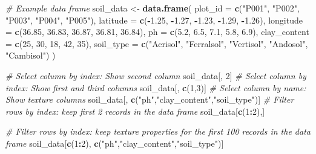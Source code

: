 \documentclass[
  10pt,
  b5paper,
  oneside]{book}
\newenvironment{Shaded}{\begin{snugshade}}{\end{snugshade}}
\newcommand{\AttributeTok}[1]{\textcolor[rgb]{0.13,0.29,0.53}{#1}}
\newcommand{\CommentTok}[1]{\textcolor[rgb]{0.56,0.35,0.01}{\textit{#1}}}
\newcommand{\DecValTok}[1]{\textcolor[rgb]{0.00,0.00,0.81}{#1}}
\newcommand{\FloatTok}[1]{\textcolor[rgb]{0.00,0.00,0.81}{#1}}
\newcommand{\FunctionTok}[1]{\textcolor[rgb]{0.13,0.29,0.53}{\textbf{#1}}}
\newcommand{\NormalTok}[1]{#1}
\newcommand{\OtherTok}[1]{\textcolor[rgb]{0.56,0.35,0.01}{#1}}
\newcommand{\SpecialCharTok}[1]{\textcolor[rgb]{0.81,0.36,0.00}{\textbf{#1}}}
\newcommand{\StringTok}[1]{\textcolor[rgb]{0.31,0.60,0.02}{#1}}
\begin{document}
\begin{Shaded}
\begin{Highlighting}[]
\CommentTok{\# Example data frame}
\NormalTok{soil\_data }\OtherTok{\textless{}{-}} \FunctionTok{data.frame}\NormalTok{(}
  \AttributeTok{plot\_id =} \FunctionTok{c}\NormalTok{(}\StringTok{"P001"}\NormalTok{, }\StringTok{"P002"}\NormalTok{, }\StringTok{"P003"}\NormalTok{, }\StringTok{"P004"}\NormalTok{, }\StringTok{"P005"}\NormalTok{),}
  \AttributeTok{latitude =} \FunctionTok{c}\NormalTok{(}\SpecialCharTok{{-}}\FloatTok{1.25}\NormalTok{, }\SpecialCharTok{{-}}\FloatTok{1.27}\NormalTok{, }\SpecialCharTok{{-}}\FloatTok{1.23}\NormalTok{, }\SpecialCharTok{{-}}\FloatTok{1.29}\NormalTok{, }\SpecialCharTok{{-}}\FloatTok{1.26}\NormalTok{),}
  \AttributeTok{longitude =} \FunctionTok{c}\NormalTok{(}\FloatTok{36.85}\NormalTok{, }\FloatTok{36.83}\NormalTok{, }\FloatTok{36.87}\NormalTok{, }\FloatTok{36.81}\NormalTok{, }\FloatTok{36.84}\NormalTok{),}
  \AttributeTok{ph =} \FunctionTok{c}\NormalTok{(}\FloatTok{5.2}\NormalTok{, }\FloatTok{6.5}\NormalTok{, }\FloatTok{7.1}\NormalTok{, }\FloatTok{5.8}\NormalTok{, }\FloatTok{6.9}\NormalTok{),}
  \AttributeTok{clay\_content =} \FunctionTok{c}\NormalTok{(}\DecValTok{25}\NormalTok{, }\DecValTok{30}\NormalTok{, }\DecValTok{18}\NormalTok{, }\DecValTok{42}\NormalTok{, }\DecValTok{35}\NormalTok{),}
  \AttributeTok{soil\_type =} \FunctionTok{c}\NormalTok{(}\StringTok{"Acrisol"}\NormalTok{, }\StringTok{"Ferralsol"}\NormalTok{, }\StringTok{"Vertisol"}\NormalTok{, }\StringTok{"Andosol"}\NormalTok{, }\StringTok{"Cambisol"}\NormalTok{)}
\NormalTok{)}

\CommentTok{\# Select column by index: Show second column}
\NormalTok{soil\_data[, }\DecValTok{2}\NormalTok{]}
\CommentTok{\# Select column by index: Show first and third columns}
\NormalTok{soil\_data[, }\FunctionTok{c}\NormalTok{(}\DecValTok{1}\NormalTok{,}\DecValTok{3}\NormalTok{)]}
\CommentTok{\# Select column  by name: Show texture columns}
\NormalTok{soil\_data[, }\FunctionTok{c}\NormalTok{(}\StringTok{"ph"}\NormalTok{,}\StringTok{"clay\_content"}\NormalTok{,}\StringTok{"soil\_type"}\NormalTok{)]}
\CommentTok{\# Filter rows by index: keep first 2 records in the data frame}
\NormalTok{soil\_data[}\FunctionTok{c}\NormalTok{(}\DecValTok{1}\SpecialCharTok{:}\DecValTok{2}\NormalTok{),]}

\CommentTok{\# Filter rows by index: keep texture properties for the first 100 records in the data frame}
\NormalTok{soil\_data[}\FunctionTok{c}\NormalTok{(}\DecValTok{1}\SpecialCharTok{:}\DecValTok{2}\NormalTok{), }\FunctionTok{c}\NormalTok{(}\StringTok{"ph"}\NormalTok{,}\StringTok{"clay\_content"}\NormalTok{,}\StringTok{"soil\_type"}\NormalTok{)]}


\end{Highlighting}
\end{Shaded}
\end{document}
